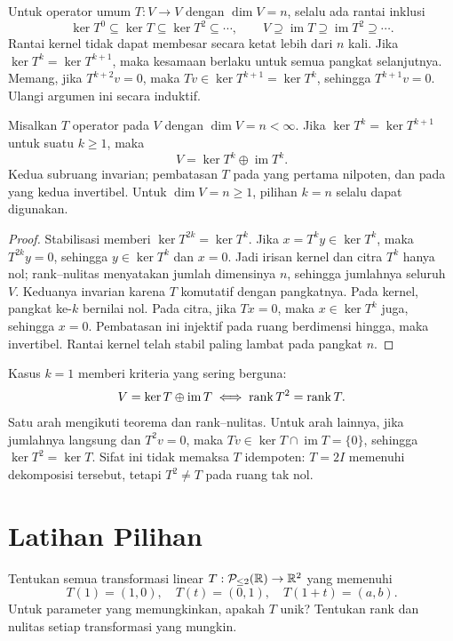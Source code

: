 Untuk operator umum $T:V\to V$ dengan $\dim V=n$, selalu ada
rantai inklusi
\[
    \ker T^0\subseteq\ker T\subseteq\ker T^2\subseteq\cdots,
    \qquad
    V\supseteq\operatorname{im}T\supseteq\operatorname{im}T^2\supseteq\cdots.
\]
Rantai kernel tidak dapat membesar secara ketat lebih dari $n$ kali.
Jika $\ker T^k=\ker T^{k+1}$, maka kesamaan berlaku untuk semua
pangkat selanjutnya. Memang, jika $T^{k+2}v=0$, maka
$Tv\in\ker T^{k+1}=\ker T^k$, sehingga $T^{k+1}v=0$.
Ulangi argumen ini secara induktif.

\begin{teorema}
    Misalkan $T$ operator pada $V$ dengan $\dim V=n<\infty$.
    Jika $\ker T^k=\ker T^{k+1}$ untuk suatu $k\ge1$, maka
    \[
        V=\ker T^k\oplus\operatorname{im}T^k.
    \]
    Kedua subruang invarian; pembatasan $T$ pada yang pertama
    nilpoten, dan pada yang kedua invertibel.
    Untuk $\dim V=n\ge1$, pilihan $k=n$ selalu dapat digunakan.
\end{teorema}
\begin{proof}
    Stabilisasi memberi $\ker T^{2k}=\ker T^k$.
    Jika $x=T^ky\in\ker T^k$, maka $T^{2k}y=0$, sehingga
    $y\in\ker T^k$ dan $x=0$.
    Jadi irisan kernel dan citra $T^k$ hanya nol; rank--nulitas
    menyatakan jumlah dimensinya $n$, sehingga jumlahnya seluruh $V$.
    Keduanya invarian karena $T$ komutatif dengan pangkatnya.
    Pada kernel, pangkat ke-$k$ bernilai nol.
    Pada citra, jika $Tx=0$, maka $x\in\ker T^k$ juga,
    sehingga $x=0$. Pembatasan ini injektif pada ruang berdimensi
    hingga, maka invertibel.
    Rantai kernel telah stabil paling lambat pada pangkat $n$.
\end{proof}

Kasus $k=1$ memberi kriteria yang sering berguna:
\[
    V=\ker T\oplus\operatorname{im}T
    \iff\operatorname{rank} T^2=\operatorname{rank} T.
\]
Satu arah mengikuti teorema dan rank--nulitas. Untuk arah lainnya,
jika jumlahnya langsung dan $T^2v=0$, maka
$Tv\in\ker T\cap\operatorname{im}T=\{0\}$, sehingga
$\ker T^2=\ker T$.
Sifat ini tidak memaksa $T$ idempoten: $T=2I$ memenuhi
dekomposisi tersebut, tetapi $T^2\ne T$ pada ruang tak nol.

\section{Latihan Pilihan}

\begin{latihan}\label{trans:lat-data}
    Tentukan semua transformasi linear
    $T:\mathcal P_{\le2}(\mathbb{R})\to\mathbb{R}^2$ yang memenuhi
    \[
        T(1)=(1,0),\quad T(t)=(0,1),\quad T(1+t)=(a,b).
    \]
    Untuk parameter yang memungkinkan, apakah $T$ unik?
    Tentukan rank dan nulitas setiap transformasi yang mungkin.
\end{latihan}

